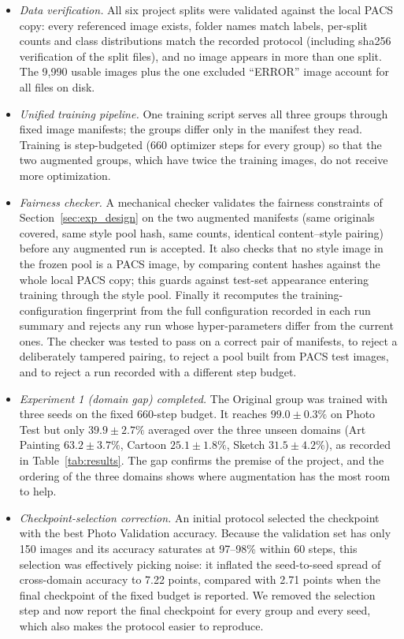 \documentclass[conference]{IEEEtran}
\begin{document}
\begin{itemize}
\item \textit{Data verification.} All six project splits were validated against the local PACS copy: every referenced image exists, folder names match labels, per-split counts and class distributions match the recorded protocol (including sha256 verification of the split files), and no image appears in more than one split. The 9{,}990 usable images plus the one excluded ``ERROR'' image account for all files on disk.
\item \textit{Unified training pipeline.} One training script serves all three groups through fixed image manifests; the groups differ only in the manifest they read. Training is step-budgeted (660 optimizer steps for every group) so that the two augmented groups, which have twice the training images, do not receive more optimization.
\item \textit{Fairness checker.} A mechanical checker validates the fairness constraints of Section~\ref{sec:exp_design} on the two augmented manifests (same originals covered, same style pool hash, same counts, identical content--style pairing) before any augmented run is accepted. It also checks that no style image in the frozen pool is a PACS image, by comparing content hashes against the whole local PACS copy; this guards against test-set appearance entering training through the style pool. Finally it recomputes the training-configuration fingerprint from the full configuration recorded in each run summary and rejects any run whose hyper-parameters differ from the current ones. The checker was tested to pass on a correct pair of manifests, to reject a deliberately tampered pairing, to reject a pool built from PACS test images, and to reject a run recorded with a different step budget.
\item \textit{Experiment 1 (domain gap) completed.} The Original group was trained with three seeds on the fixed 660-step budget. It reaches $99.0\pm0.3\%$ on Photo Test but only $39.9\pm2.7\%$ averaged over the three unseen domains (Art Painting $63.2\pm3.7\%$, Cartoon $25.1\pm1.8\%$, Sketch $31.5\pm4.2\%$), as recorded in Table~\ref{tab:results}. The gap confirms the premise of the project, and the ordering of the three domains shows where augmentation has the most room to help.
\item \textit{Checkpoint-selection correction.} An initial protocol selected the checkpoint with the best Photo Validation accuracy. Because the validation set has only 150 images and its accuracy saturates at 97--98\% within 60 steps, this selection was effectively picking noise: it inflated the seed-to-seed spread of cross-domain accuracy to 7.22 points, compared with 2.71 points when the final checkpoint of the fixed budget is reported. We removed the selection step and now report the final checkpoint for every group and every seed, which also makes the protocol easier to reproduce.
\end{itemize}
\end{document}
